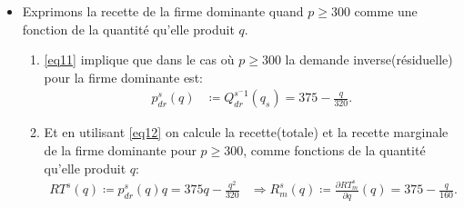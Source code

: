 \begin{frame}
\begin{itemize}
\begin{align}
\begin{array}{ll}
60000 - 120p & \text{sinon}.
\end{array}\right.
\label{eq11}
\end{align}
\item Exprimons la recette de la firme dominante quand $p\geq 300$ comme une fonction de la quantité qu'elle produit $q$.
\begin{enumerate}[$\cdot$]
   \item \eqref{eq11}  implique que dans le cas où $p\geq 300$ la demande inverse(résiduelle) pour la firme dominante est:
   \begin{align}
   p_{dr}^s(q) &\coloneqq Q_{dr}^{s^-1}(q_s) = 375 - \frac{q}{320}\label{eq12}.
   \end{align} 
   \item Et en utilisant \eqref{eq12} on calcule la recette(totale) et  la recette marginale de la firme dominante pour $p\geq 300$, comme fonctions de la quantité qu'elle produit $q$:
   \begin{align}
   RT^s(q) \coloneqq  p_{dr}^s(q)q = 375q - \frac{q^2}{320}&\Rightarrow R^s_m(q) \coloneqq \frac{\partial RT_m^{s}}{\partial q}(q) = 375-  \frac{q}{160}.
   \label{eq13}
   \end{align}
\end{enumerate}
   \end{itemize}
 \end{frame}
 
